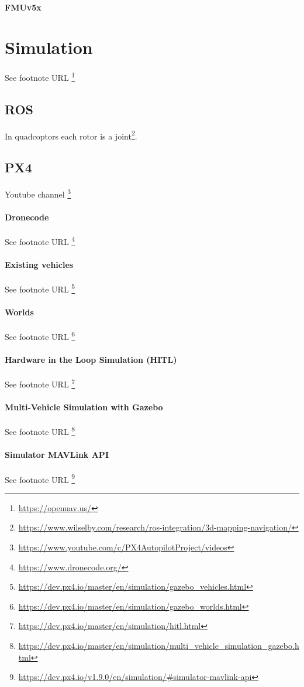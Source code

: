 \documentclass{article}
\begin{document}
		\paragraph{FMUv5x}
	
			
	\section{Simulation}
		See footnote URL \footnote{\url{https://openuav.us/}}
		\subsection{ROS}
			In quadcoptors each rotor is a joint\footnote{\url{https://www.wilselby.com/research/ros-integration/3d-mapping-navigation/}}. 
		\subsection{PX4}
			Youtube channel \footnote{\url{https://www.youtube.com/c/PX4AutopilotProject/videos}}
			\paragraph{Dronecode}
			See footnote URL \footnote{\url{https://www.dronecode.org/}} 
			\paragraph{Existing vehicles}
			See footnote URL \footnote{\url{https://dev.px4.io/master/en/simulation/gazebo_vehicles.html}} 
			\paragraph{Worlds}
			See footnote URL \footnote{\url{https://dev.px4.io/master/en/simulation/gazebo_worlds.html}}
			\paragraph{Hardware in the Loop Simulation (HITL)}
			See footnote URL \footnote{\url{https://dev.px4.io/master/en/simulation/hitl.html}}
			\paragraph{Multi-Vehicle Simulation with Gazebo}
			See footnote URL \footnote{\url{https://dev.px4.io/master/en/simulation/multi_vehicle_simulation_gazebo.html}}
			\paragraph{Simulator MAVLink API}
			See footnote URL \footnote{\url{https://dev.px4.io/v1.9.0/en/simulation/#simulator-mavlink-api}}
\end{document}
